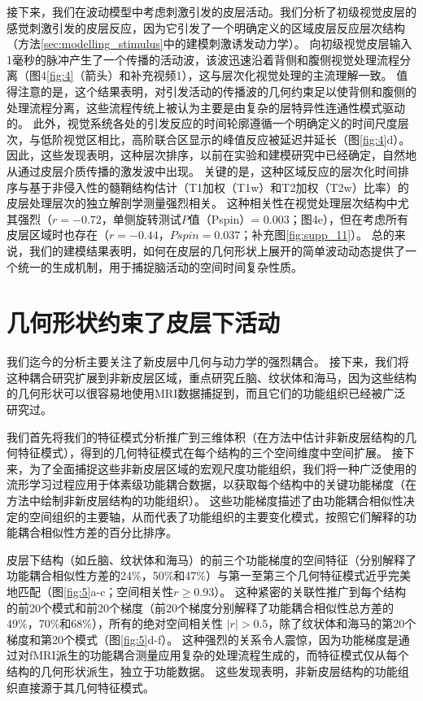 \documentclass[lang=cn,a4paper,newtx]{elegantpaper}
\begin{document}
接下来，我们在波动模型中考虑刺激引发的皮层活动。我们分析了初级视觉皮层的感觉刺激引发的皮层反应，因为它引发了一个明确定义的区域皮层反应层次结构（方法\ref{sec:modelling_stimulus}中的建模刺激诱发动力学）。
向初级视觉皮层输入1毫秒的脉冲产生了一个传播的活动波，该波迅速沿着背侧和腹侧视觉处理流程分离（图4\ref{fig:4}（箭头）和补充视频1），这与层次化视觉处理的主流理解一致。
值得注意的是，这个结果表明，对引发活动的传播波的几何约束足以使背侧和腹侧的处理流程分离，这些流程传统上被认为主要是由复杂的层特异性连通性模式驱动的。
此外，视觉系统各处的引发反应的时间轮廓遵循一个明确定义的时间尺度层次，与低阶视觉区相比，高阶联合区显示的峰值反应被延迟并延长（图\ref{fig:4}d）。
因此，这些发现表明，这种层次排序，以前在实验和建模研究中已经确定，自然地从通过皮层介质传播的激发波中出现。
关键的是，这种区域反应的层次化时间排序与基于非侵入性的髓鞘结构估计（T1加权（T1w）和T2加权（T2w）比率）的皮层处理层次的独立解剖学测量强烈相关。
这种相关性在视觉处理层次结构中尤其强烈（$ r = -0.72 $，单侧旋转测试$ P $值（Pspin）= 0.003；图4e），但在考虑所有皮层区域时也存在（$ r = -0.44 $，$ Pspin = 0.037 $；补充图\ref{fig:supp_11}）。
总的来说，我们的建模结果表明，如何在皮层的几何形状上展开的简单波动动态提供了一个统一的生成机制，用于捕捉脑活动的空间时间复杂性质。


\section{几何形状约束了皮层下活动}

我们迄今的分析主要关注了新皮层中几何与动力学的强烈耦合。
接下来，我们将这种耦合研究扩展到非新皮层区域，重点研究丘脑、纹状体和海马，因为这些结构的几何形状可以很容易地使用MRI数据捕捉到，而且它们的功能组织已经被广泛研究过。


我们首先将我们的特征模式分析推广到三维体积（在方法中估计非新皮层结构的几何特征模式），得到的几何特征模式在每个结构的三个空间维度中空间扩展。
接下来，为了全面捕捉这些非新皮层区域的宏观尺度功能组织，我们将一种广泛使用的流形学习过程应用于体素级功能耦合数据，以获取每个结构中的关键功能梯度（在方法中绘制非新皮层结构的功能组织）。
这些功能梯度描述了由功能耦合相似性决定的空间组织的主要轴，从而代表了功能组织的主要变化模式，按照它们解释的功能耦合相似性方差的百分比排序。


皮层下结构（如丘脑、纹状体和海马）的前三个功能梯度的空间特征（分别解释了功能耦合相似性方差的24\%，50\%和47\%）与第一至第三个几何特征模式近乎完美地匹配（图\ref{fig:5}a-c；空间相关性$ r\geq0.93 $）。
这种紧密的关联性推广到每个结构的前20个模式和前20个梯度（前20个梯度分别解释了功能耦合相似性总方差的49\%，70\%和68\%），所有的绝对空间相关性 $ |r| > 0.5 $，除了纹状体和海马的第20个梯度和第20个模式（图\ref{fig:5}d-f）。
这种强烈的关系令人震惊，因为功能梯度是通过对fMRI派生的功能耦合测量应用复杂的处理流程生成的，而特征模式仅从每个结构的几何形状派生，独立于功能数据。
这些发现表明，非新皮层结构的功能组织直接源于其几何特征模式。
\end{document}
